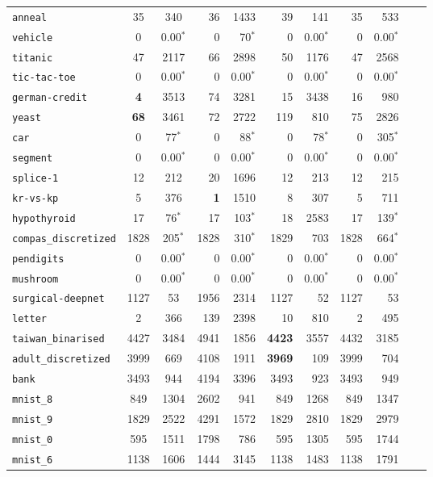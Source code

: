 \begin{tabular}{lccrrrrrrrr}
\texttt{anneal} & 35 & 340 & 36 & 1433 & 39 & 141 & 35 & 533\\
\texttt{vehicle} & 0 & 0.00$^*$ & 0 & 70$^*$ & 0 & 0.00$^*$ & 0 & 0.00$^*$\\
\texttt{titanic} & 47 & 2117 & 66 & 2898 & 50 & 1176 & 47 & 2568\\
\texttt{tic-tac-toe} & 0 & 0.00$^*$ & 0 & 0.00$^*$ & 0 & 0.00$^*$ & 0 & 0.00$^*$\\
\texttt{german-credit} & \textbf{4} & 3513 & 74 & 3281 & 15 & 3438 & 16 & 980\\
\texttt{yeast} & \textbf{68} & 3461 & 72 & 2722 & 119 & 810 & 75 & 2826\\
\texttt{car} & 0 & 77$^*$ & 0 & 88$^*$ & 0 & 78$^*$ & 0 & 305$^*$\\
\texttt{segment} & 0 & 0.00$^*$ & 0 & 0.00$^*$ & 0 & 0.00$^*$ & 0 & 0.00$^*$\\
\texttt{splice-1} & 12 & 212 & 20 & 1696 & 12 & 213 & 12 & 215\\
\texttt{kr-vs-kp} & 5 & 376 & \textbf{1} & 1510 & 8 & 307 & 5 & 711\\
\texttt{hypothyroid} & 17 & 76$^*$ & 17 & 103$^*$ & 18 & 2583 & 17 & 139$^*$\\
\texttt{compas\_discretized} & 1828 & 205$^*$ & 1828 & 310$^*$ & 1829 & 703 & 1828 & 664$^*$\\
\texttt{pendigits} & 0 & 0.00$^*$ & 0 & 0.00$^*$ & 0 & 0.00$^*$ & 0 & 0.00$^*$\\
\texttt{mushroom} & 0 & 0.00$^*$ & 0 & 0.00$^*$ & 0 & 0.00$^*$ & 0 & 0.00$^*$\\
\texttt{surgical-deepnet} & 1127 & 53 & 1956 & 2314 & 1127 & 52 & 1127 & 53\\
\texttt{letter} & 2 & 366 & 139 & 2398 & 10 & 810 & 2 & 495\\
\texttt{taiwan\_binarised} & 4427 & 3484 & 4941 & 1856 & \textbf{4423} & 3557 & 4432 & 3185\\
\texttt{adult\_discretized} & 3999 & 669 & 4108 & 1911 & \textbf{3969} & 109 & 3999 & 704\\
\texttt{bank} & 3493 & 944 & 4194 & 3396 & 3493 & 923 & 3493 & 949\\
\texttt{mnist\_8} & 849 & 1304 & 2602 & 941 & 849 & 1268 & 849 & 1347\\
\texttt{mnist\_9} & 1829 & 2522 & 4291 & 1572 & 1829 & 2810 & 1829 & 2979\\
\texttt{mnist\_0} & 595 & 1511 & 1798 & 786 & 595 & 1305 & 595 & 1744\\
\texttt{mnist\_6} & 1138 & 1606 & 1444 & 3145 & 1138 & 1483 & 1138 & 1791\\

\end{tabular}
